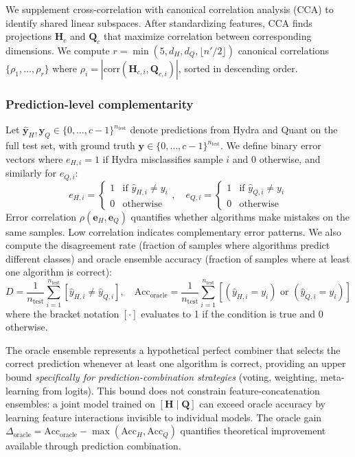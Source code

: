 \documentclass[pdflatex,sn-basic]{sn-jnl}           %
\theoremstyle{thmstyleone}%
\theoremstyle{thmstyletwo}%
\theoremstyle{thmstylethree}%
\begin{document}
We supplement cross-correlation with canonical correlation analysis (CCA) to identify shared linear subspaces. After standardizing features, CCA finds projections $\mathbf{H}_c$ and $\mathbf{Q}_c$ that maximize correlation between corresponding dimensions. We compute $r = \min(5, d_H, d_Q, \lfloor n'/2 \rfloor)$ canonical correlations $\{\rho_1, \ldots, \rho_r\}$ where $\rho_i = |\text{corr}(\mathbf{H}_{c,i}, \mathbf{Q}_{c,i})|$, sorted in descending order.

\subsubsection{Prediction-level complementarity} 

Let $\hat{\mathbf{y}}_H, \hat{\mathbf{y}}_Q \in \{0, \ldots, c-1\}^{n_{\text{test}}}$ denote predictions from Hydra and Quant on the full test set, with ground truth $\mathbf{y} \in \{0, \ldots, c-1\}^{n_{\text{test}}}$. We define binary error vectors where $e_{H,i} = 1$ if Hydra misclassifies sample $i$ and 0 otherwise, and similarly for $e_{Q,i}$:
\begin{equation}
e_{H,i} = \begin{cases}
1 & \text{if } \hat{y}_{H,i} \neq y_i \\
0 & \text{otherwise}
\end{cases}, \quad
e_{Q,i} = \begin{cases}
1 & \text{if } \hat{y}_{Q,i} \neq y_i \\
0 & \text{otherwise}
\end{cases}
\end{equation}
Error correlation $\rho(\mathbf{e}_H, \mathbf{e}_Q)$ quantifies whether algorithms make mistakes on the same samples. Low correlation indicates complementary error patterns. We also compute the disagreement rate (fraction of samples where algorithms predict different classes) and oracle ensemble accuracy (fraction of samples where at least one algorithm is correct):
\begin{equation}
D = \frac{1}{n_{\text{test}}} \sum_{i=1}^{n_{\text{test}}} [\hat{y}_{H,i} \neq \hat{y}_{Q,i}], \quad
\text{Acc}_{\text{oracle}} = \frac{1}{n_{\text{test}}} \sum_{i=1}^{n_{\text{test}}} [(\hat{y}_{H,i} = y_i) \text{ or } (\hat{y}_{Q,i} = y_i)]
\end{equation}
where the bracket notation $[\cdot]$ evaluates to 1 if the condition is true and 0 otherwise.

The oracle ensemble represents a hypothetical perfect combiner that selects the correct prediction whenever at least one algorithm is correct, providing an upper bound \textit{specifically for prediction-combination strategies} (voting, weighting, meta-learning from logits). This bound does not constrain feature-concatenation ensembles: a joint model trained on $[\mathbf{H} \mid \mathbf{Q}]$ can exceed oracle accuracy by learning feature interactions invisible to individual models. The oracle gain $\Delta_{\text{oracle}} = \text{Acc}_{\text{oracle}} - \max(\text{Acc}_H, \text{Acc}_Q)$ quantifies theoretical improvement available through prediction combination.
\end{document}
